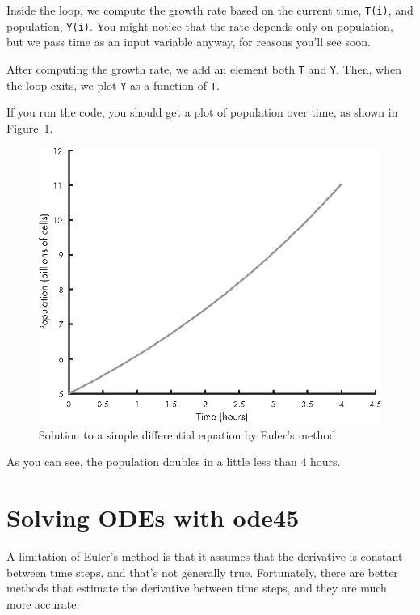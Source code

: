 Inside the loop, we compute the growth rate based on the current time, \lstinline{T(i)}, and population, \lstinline{Y(i)}.  You might notice that the rate depends only on population, but we pass time as an input variable anyway, for reasons you'll see soon.

After computing the growth rate, we add an element both \lstinline{T} and \lstinline{Y}.  Then, when the loop exits, we plot \lstinline{Y} as a function of \lstinline{T}.

If you run the code, you should get a plot of population over time, as shown in Figure~\ref{fig:euler}. 

\begin{figure}[ht]
\includegraphics{images/figure09_01_new.eps}
\caption{Solution to a simple differential equation by Euler's method}
\label{fig:euler}
\end{figure}

As you can see, the population doubles in a little less than 4 hours.


\section{Solving ODEs with ode45}
\label{ode45}

A limitation of Euler's method is that it assumes that the derivative is constant between time steps, and that's not generally true.  Fortunately, there are better methods that estimate the derivative between time steps, and \linebreak they are much more accurate.

